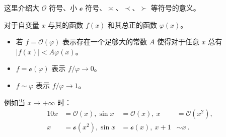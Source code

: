 
这里介绍大 $\mathcal O$ 符号、小 $\mathcal o$ 符号、$\asymp$、$\prec$、$\succ $ 等符号的意义。

对于自变量 $x$ 与其的函数 $f(x)$ 和其总正的函数 $\varphi(x)$。
\begin{itemize}
\item 若 $f=\mathcal O(\varphi)$ 表示存在一个足够大的常数 $A$ 使得对于任意 $x$ 总有 $|f(x)| < A \varphi(x)$。
\item $f = \mathcal o(\varphi)$ 表示 $f/\varphi \rightarrow 0$。
\item $f \sim \varphi$ 表示 $f / \varphi \rightarrow 1$。
\end{itemize}

例如当 $x \rightarrow +\infty$ 时：
\begin{equation}
\begin{aligned}
10x &= \mathcal O(x),\sin x &= \mathcal O(x), ~ x &= \mathcal O(x^2), ~\\
x &= \mathcal o(x^2),\sin x &= \mathcal o(x), ~ x + 1 &\sim x ~.
\end{aligned}
\end{equation}

